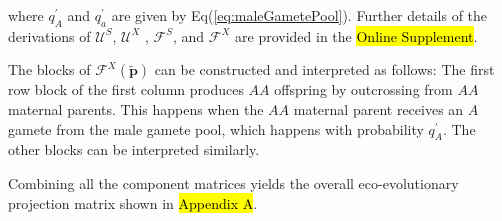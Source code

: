 \documentclass[11pt]{article}
\def\mbf#1{\mathbf{#1}}
\def\mcal#1{\mathcal{#1}}
\begin{document}
\noindent where $q^{\prime}_A$ and $q^{\prime}_a$ are given by Eq(\ref{eq:maleGametePool}). Further details of the derivations of $\mcal{U}^S$, $\mcal{U}^X$ ,  $\mcal{F}^S$, and $\mcal{F}^X$ are provided in the \hl{Online Supplement}. 

The blocks of $\mcal{F}^X(\tilde{\mbf{p}})$ can be constructed and interpreted as follows: The first row block of the first column produces $AA$ offspring by outcrossing from $AA$ maternal parents. This happens when the $AA$ maternal parent receives an $A$ gamete from the male gamete pool, which happens with probability $q^{\prime}_{A}$. The other blocks can be interpreted similarly.

Combining all the component matrices yields the overall eco-evolutionary projection matrix shown in \hl{Appendix A}.
\end{document}

